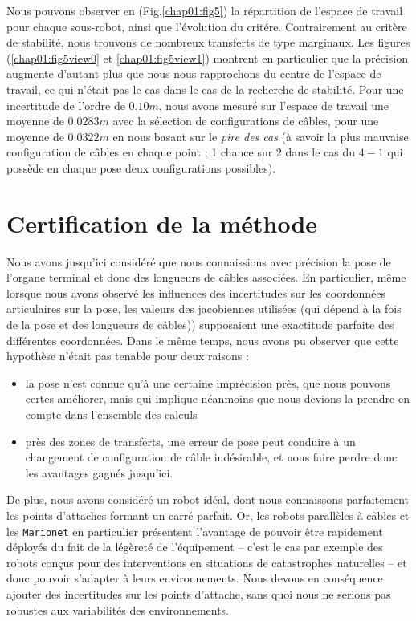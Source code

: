 Nous pouvons observer en (Fig.\ref{chap01:fig5}) la r\'epartition de l'espace 
de travail pour chaque sous-robot, ainsi que l'\'evolution du crit\'ere. 
Contrairement au crit\`ere de stabilit\'e, nous trouvons de nombreux transferts 
de type marginaux. Les figures (\ref{chap01:fig5view0} et 
\ref{chap01:fig5view1}) montrent en particulier que la pr\'ecision augmente 
d'autant plus que nous nous rapprochons du centre de l'espace de travail, ce qui 
n'\'etait pas le cas dans le cas de la recherche de stabilit\'e. Pour une 
incertitude de l'ordre de $0.10m$, nous avons mesur\'e sur l'espace de travail 
une moyenne de $0.0283m$ avec la s\'election de configurations de c\^ables, pour 
une moyenne de $0.0322m$ en nous basant sur le {\it pire des cas} (\`a savoir la 
plus mauvaise configuration de c\^ables en chaque point ; 1 chance sur 2 dans le 
cas du $4-1$ qui poss\`ede en chaque pose deux configurations possibles).

\section{Certification de la m\'ethode}

Nous avons jusqu'ici consid\'er\'e que nous connaissions avec pr\'ecision la 
pose de l'organe terminal et donc des longueurs de c\^ables associ\'ees. En 
particulier, m\^eme lorsque nous avons observ\'e les influences des 
incertitudes sur les coordonn\'ees articulaires sur la pose, les 
valeurs des jacobiennes utilis\'ees (qui d\'epend \`a la fois de la pose et des 
longueurs de c\^ables)) supposaient une exactitude parfaite des diff\'erentes 
coordonn\'ees. Dans le m\^eme temps, nous avons pu observer que cette 
hypoth\`ese n'\'etait pas tenable pour deux raisons :
\begin{itemize}
 \item la pose n'est connue qu'\`a une certaine impr\'ecision pr\`es, que nous 
pouvons certes am\'eliorer, mais qui implique n\'eanmoins que nous devions la 
prendre en compte dans l'ensemble des calculs
\item pr\`es des zones de transferts, une erreur de pose peut conduire \`a un 
changement de configuration de c\^able ind\'esirable, et nous faire perdre donc 
les avantages gagn\'es jusqu'ici.
\end{itemize}

De plus, nous avons consid\'er\'e un robot id\'eal, dont nous connaissons 
parfaitement les points d'attaches formant un carr\'e parfait. Or, les robots 
parall\`eles \`a c\^ables et les {\tt Marionet} en particulier pr\'esentent 
l'avantage de pouvoir \^etre rapidement d\'eploy\'es du fait de la 
l\'eg\`eret\'e de l'\'equipement -- c'est le cas par exemple des robots con\c 
cus pour des interventions en situations de catastrophes naturelles -- et donc 
pouvoir s'adapter \`a leurs environnements. Nous devons en cons\'equence 
ajouter des incertitudes sur les points d'attache, sans quoi nous ne serions 
pas robustes aux variabilit\'es des environnements.


